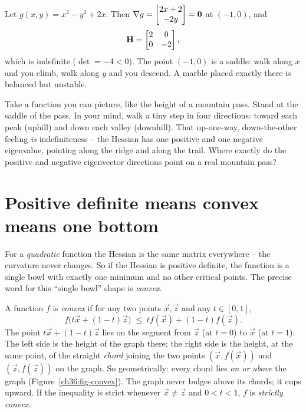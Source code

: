 \begin{example}[A saddle]
\label{ch36:ex-saddle}
Let $g(x,y)=x^2 - y^2 + 2x$. Then $\nabla g=\begin{bmatrix}2x+2\\-2y\end{bmatrix}=\mathbf{0}$ at $(-1,0)$,
and 
\[
  \mathbf{H}=\begin{bmatrix}2&0\\0&-2\end{bmatrix},
\]
which is indefinite ($\det=-4<0$). The
point $(-1,0)$ is a saddle: walk along $x$ and you climb, walk along $y$ and you
descend. A marble placed exactly there is balanced but unstable.
\end{example}

\begin{walkbox}
Take a function you can picture, like the height of a mountain pass. Stand at the
saddle of the pass. In your mind, walk a tiny step in four directions: toward each
peak (uphill) and down each valley (downhill). That up-one-way, down-the-other
feeling \emph{is} indefiniteness -- the Hessian has one positive and one negative
eigenvalue, pointing along the ridge and along the trail. Where exactly do the
positive and negative eigenvector directions point on a real mountain pass?
\end{walkbox}

\section{Positive definite means convex means one bottom}
\label{ch36:convexity}

For a \emph{quadratic} function the Hessian is the same matrix everywhere -- the
curvature never changes. So if the Hessian is positive definite, the function is a
single bowl with exactly one minimum and no other critical points. The precise word
for this ``single bowl'' shape is \emph{convex}.

\begin{definition}
\label{ch36:def-convex}
A function $f$ is \emph{convex} if for any two points $\vec{x},\vec{z}$ and any
$t\in[0,1]$,
\[
  f\big(t\vec{x} + (1-t)\vec{z}\big) \;\le\; t f(\vec{x}) + (1-t) f(\vec{z}).
\]
The point $t\vec{x}+(1-t)\vec{z}$ lies on the segment from $\vec{z}$ (at $t=0$) to
$\vec{x}$ (at $t=1$). The left side is the height of the graph there; the right side
is the height, at the same point, of the straight \emph{chord} joining the two points
$(\vec{x},f(\vec{x}))$ and $(\vec{z},f(\vec{z}))$ on the graph. So geometrically: every
chord lies \emph{on or above} the graph (Figure~\ref{ch36:fig-convex}). The graph never
bulges above its chords; it cups upward. If the inequality is strict whenever
$\vec{x}\ne\vec{z}$ and $0<t<1$, $f$ is \emph{strictly convex}.
\end{definition}

